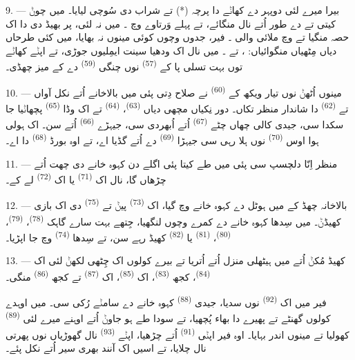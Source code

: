 9. --- بیرا میرے لئی دوپہر دے کھاݨے دا پرچہ (*) تے شراب دی سُوچی لیایا۔ میں چوݨ
کیتی تے  دے طور اُتے  نال  منگائے،
تے پہلے وَرتاوے وچ ۔ میں  نہ لئی، پر
بھیڈ دی  دا اک حصہ منگیا تے  وچ ملائی والی
۔ فیر، جدوں  وچوں کوئی مینوں نہ بھایا، میں کئی
طرحاں دیاں مِٹھیاں منگوائیاں: ،  تے ۔ میں
نال اک ودھیا سینت ایمِلیوں  جوڑی، تے اپݨے کھاݨے توں بہت تسلی پا کے
 \textsuperscript{(57)} نوں چنگی  \textsuperscript{(59)} دے
کے میز چھڈی۔

10. --- مینوں اُٹھݨ نوں تیار ویکھ کے  \textsuperscript{(60)} نے صلاح
دِتی پئی میں بالاخانے اُتے نکل آواں تے  \textsuperscript{(62)} دا شاندار
منظر تکاں۔ دور نِکیاں مچھی دیاں  \textsuperscript{(63)}،
 \textsuperscript{(64)} تے اک وڈا 
\textsuperscript{(65)} پچھاݨیا جا سکدا سی، جیدی کالی چھاں چٹے 
\textsuperscript{(67)} اُتے اُبھردی سی، جیہڑے  \textsuperscript{(66)} اُتے
سن۔ اک ہولی ہوا اوس  \textsuperscript{(70)} نوں ہلا رہی سی جیہڑا
 \textsuperscript{(69)} دے اُتے گڈیا اے، تے اوہ بورڈ 
\textsuperscript{(68)} دا اے۔

\VUsaut{3.0mm}
\VUsaut{3.0mm}

11. --- منظر اِنّا دلچسپ سی پئی میں طے کیتا پئی اگلے دن کہوہ خانے دی چھت اُتے
چڑھاں گا، نال اک  \textsuperscript{(71)} یا اک 
\textsuperscript{(72)} لے کے۔

12. --- بالاخانہ چھڈ کے میں ہوٹل دے کہوہ خانے وچ گیا، اک 
\textsuperscript{(73)} پیݨ تے  \textsuperscript{(75)} دی اک بازی کھیڈݨ۔
میں سِدھا کہوہ خانے دے کمرے وچوں لنگھیا، جِتھے بہت سارے گاہک 
\textsuperscript{(78)}،  \textsuperscript{(79)}، 
\textsuperscript{(80)}،  \textsuperscript{(81)} یا 
\textsuperscript{(82)} کھیڈ رہے سن، تے سِدھا 
\textsuperscript{(74)} وچ جا اپڑیا۔

13. --- کھیڈ مُکݨ اُتے میں ہیٹھلی منزل اُتے اُتریا تے بیرے کولوں اک چِٹھی لکھݨ لئی
اک  \textsuperscript{(84)}، کجھ  \textsuperscript{(83)}، اک
 \textsuperscript{(85)}، اک  \textsuperscript{(87)} تے کجھ
 \textsuperscript{(86)} منگی۔

فیر میں اک  \textsuperscript{(92)} نوں سدیا، جیدی 
\textsuperscript{(88)} کہوہ خانے دے سامݨے رُکی سی۔ میں اوہدے کولوں گھنٹے تے پھیرے دا
بھاء پُچھیا، تے سودا طے ہو جاوݨ اُتے اوہنے میرے لئی 
\textsuperscript{(89)} کھولیا تے مینوں اندر بہایا۔ اوہ فیر اپݨی 
\textsuperscript{(91)} اُتے چڑھیا، اپݨے  \textsuperscript{(93)} نال گھوڑیاں
نوں پھرتی نال چلایا، تے اسیں اک آنند بھری سیر اُتے نکل پئے۔
\VUsaut{6.0mm}
\VUfilet{22mm}
